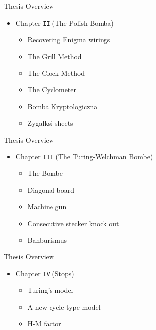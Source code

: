 \documentclass[hyphens,aspectratio=169]{beamer}
\begin{document}
\begin{frame}[fragile]{Thesis Overview}
	\begin{itemize}

		\item Chapter \texttt{II} (The Polish Bomba)
		      \vspace{1em}
		      \begin{itemize}
			      \setlength\itemsep{1em}
			      \item Recovering Enigma wirings
			      \item The Grill Method
			      \item The Clock Method
			      \item The Cyclometer
			      \item Bomba Kryptologiczna
			      \item Zygalksi sheets
		      \end{itemize}
	\end{itemize}

\end{frame}


\begin{frame}[fragile]{Thesis Overview}
	\begin{itemize}
		\item Chapter \texttt{III} (The Turing-Welchman Bombe)
		      \vspace{1em}
		      \begin{itemize}
			      \setlength\itemsep{1em}
			      \item The Bombe
			      \item Diagonal board
			      \item Machine gun
			      \item Consecutive stecker knock out
			      \item Banburismus
		      \end{itemize}
	\end{itemize}

\end{frame}

\begin{frame}[fragile]{Thesis Overview}
	\begin{itemize}
		\item Chapter \texttt{IV} (Stops)
		      \vspace{1em}
		      \begin{itemize}
			      \setlength\itemsep{1em}
			      \item Turing's model
			      \item A new cycle type model
			      \item H-M factor
		      \end{itemize}
	\end{itemize}

\end{frame}
\end{document}
